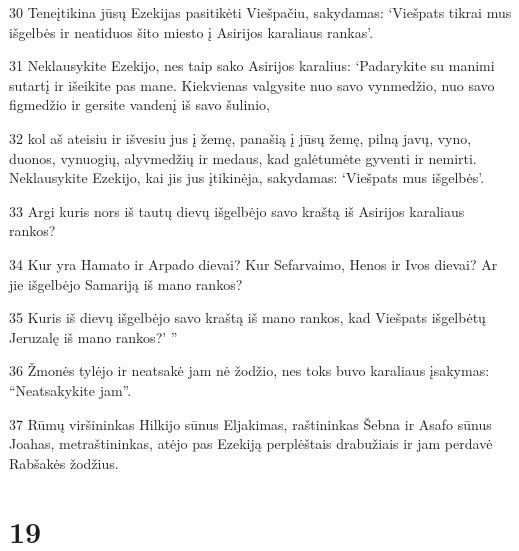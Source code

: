 \par 30 Teneįtikina jūsų Ezekijas pasitikėti Viešpačiu, sakydamas: ‘Viešpats tikrai mus išgelbės ir neatiduos šito miesto į Asirijos karaliaus rankas’. 
\par 31 Neklausykite Ezekijo, nes taip sako Asirijos karalius: ‘Padarykite su manimi sutartį ir išeikite pas mane. Kiekvienas valgysite nuo savo vynmedžio, nuo savo figmedžio ir gersite vandenį iš savo šulinio, 
\par 32 kol aš ateisiu ir išvesiu jus į žemę, panašią į jūsų žemę, pilną javų, vyno, duonos, vynuogių, alyvmedžių ir medaus, kad galėtumėte gyventi ir nemirti. Neklausykite Ezekijo, kai jis jus įtikinėja, sakydamas: ‘Viešpats mus išgelbės’. 
\par 33 Argi kuris nors iš tautų dievų išgelbėjo savo kraštą iš Asirijos karaliaus rankos? 
\par 34 Kur yra Hamato ir Arpado dievai? Kur Sefarvaimo, Henos ir Ivos dievai? Ar jie išgelbėjo Samariją iš mano rankos? 
\par 35 Kuris iš dievų išgelbėjo savo kraštą iš mano rankos, kad Viešpats išgelbėtų Jeruzalę iš mano rankos?’ ” 
\par 36 Žmonės tylėjo ir neatsakė jam nė žodžio, nes toks buvo karaliaus įsakymas: “Neatsakykite jam”. 
\par 37 Rūmų viršininkas Hilkijo sūnus Eljakimas, raštininkas Šebna ir Asafo sūnus Joahas, metraštininkas, atėjo pas Ezekiją perplėštais drabužiais ir jam perdavė Rabšakės žodžius.



\chapter{19}

